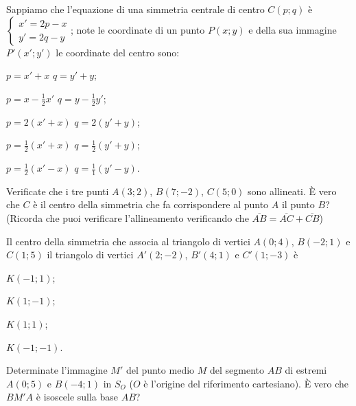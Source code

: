 \begin{esercizio}
\label{ese:8.11}
Sappiamo che l'equazione di una simmetria centrale di centro $C(p;q)$ è $\begin{cases}x'=2p-x\\y'=2q-y\end{cases}$; note le coordinate di un punto $P(x;y)$ e della sua immagine $P'(x';y')$ le coordinate del centro sono:
\begin{enumeratea}
\item $p=x'+x$ $q=y'+y$;
\item $p=x-\frac{1}{2}x'$ $q=y-\frac{1}{2}y'$;
\item $p=2(x'+x)$ $q=2(y'+y)$;
\item $p=\frac{1}{2}(x'+x)$ $q=\frac{1}{2}(y'+y)$;
\item $p=\frac{1}{2}(x'-x)$ $q=\frac{1}{1}(y'-y)$.
\end{enumeratea}
\end{esercizio}

\begin{esercizio}
\label{ese:8.12}
Verificate che i tre punti $A(3;2)$, $B(7;-2)$, $C(5;0)$ sono allineati. \`E vero che $C$ è il centro della simmetria che fa corrispondere al punto $A$ il punto $B$? (Ricorda che puoi verificare l'allineamento verificando che $\overline{AB}=\overline{AC}+\overline{CB}$)
\end{esercizio}

\begin{esercizio}
\label{ese:8.13}
Il centro della simmetria che associa al triangolo di vertici $A(0;4)$, $B(-2;1)$ e $C(1;5)$ il triangolo di vertici $A'(2;-2)$, $B'(4;1)$ e $C'(1;-3)$ è
\begin{multicols}{2}
\begin{enumeratea}
\item $K(-1;1)$;
\item $K(1;-1)$;
\item $K(1;1)$;
\item $K(-1;-1)$.
\end{enumeratea}
\end{multicols}
\end{esercizio}

\begin{esercizio}
\label{ese:8.14}
Determinate l'immagine $M'$ del punto medio $M$ del segmento $AB$ di estremi $A(0;5)$ e $B(-4;1)$ in $S_O$ ($O$ è l'origine del riferimento cartesiano). \`E vero che $BM'A$ è isoscele sulla base $AB$?
\end{esercizio}

